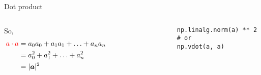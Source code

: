 \documentclass[handout]{beamer}
\begin{document}
\begin{frame}[fragile]{Dot product}
    \begin{columns}
        \begin{column}{0.5\textwidth}
            So,
            \begin{align*}
                \textcolor{red}{a \cdot a} &= a_0a_0 + a_1a_1 + \ldots + a_na_n \\
                                           &= a_0^2  + a_1^2  + \ldots + a_n^2 \\
                                           &= |\boldsymbol{a}|^2
            \end{align*}
        \end{column}
        \begin{column}{0.5\textwidth}
            \begin{alertblock}{}
                \begin{lstlisting}
                np.linalg.norm(a) ** 2
                # or 
                np.vdot(a, a)
                \end{lstlisting}
            \end{alertblock}
        \end{column}
    \end{columns}
\end{frame}
\end{document}
